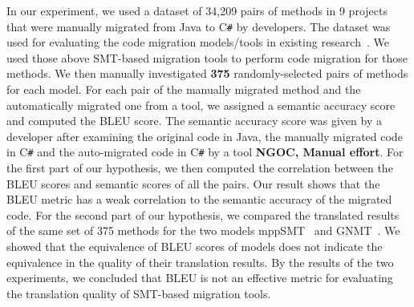 %

In our experiment, we used a dataset of 34,209 pairs of methods in 9
projects that were manually migrated from Java to C\texttt{\#} by
developers. The dataset was used for evaluating the code migration
models/tools in existing research~\cite{ase15}. We used those above
SMT-based migration tools to perform code migration for those
methods. We then manually investigated {\bf 375} randomly-selected
pairs of methods for each model. For each pair of the manually
migrated method and the automatically migrated one from a tool, we
assigned a semantic accuracy score and computed the BLEU score. The
semantic accuracy score was given by a developer after examining the
original code in Java, the manually migrated code in C\texttt{\#} and
the auto-migrated code in C\texttt{\#} by a tool \textbf{NGOC, Manual effort}. 
For the first part of our hypothesis, we then computed the correlation 
between the BLEU scores and semantic scores of all the pairs. Our result shows that the
BLEU metric has a weak correlation to the semantic accuracy of the
migrated code. For the second part of our hypothesis, we compared the
translated results of the same set of 375 methods for the two models
mppSMT~\cite{ase15} and GNMT~\cite{gnmt}.
%
We showed that the equivalence of BLEU scores of models does not indicate 
the equivalence in the quality of their translation results.
By the results of the two experiments, we concluded that BLEU is not
an effective metric for evaluating the translation quality of
SMT-based migration tools.

